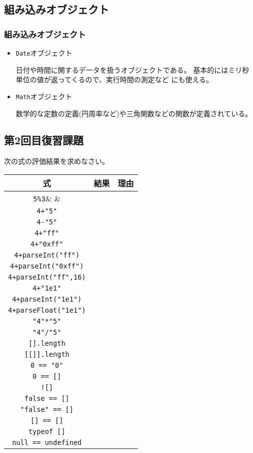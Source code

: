 \subsection{組み込みオブジェクト}
\begin{frame}[containsverbatim]
 \frametitle{組み込みオブジェクト}
\begin{itemize}
 \item \texttt{Date}オブジェクト

日付や時間に関するデータを扱うオブジェクトである。
基本的にはミリ秒単位の値が返ってくるので、実行時間の測定など
にも使える。
 \item {\texttt{Math}オブジェクト}

数学的な定数の定義(円周率など)や三角関数などの関数が定義されている。
\end{itemize}
\end{frame}



\subsection{第2回目復習課題}
\newcommand{\Rule}{\rule[-2ex]{0em}{5ex}}
次の式の評価結果を求めなさい。
\begin{center}
 \begin{tabular}{|>{\Rule}c|p{}|p{}|}\hline
  式&\multicolumn{1}{c|}{結果} &\multicolumn{1}{c|}{理由} \\\hline
  \Verb+5%
  \Verb-4+"5"-& & \\ \hline
  \Verb+4-"5"+& & \\ \hline
  \Verb-4+"ff"-& & \\ \hline
  \Verb-4+"0xff"-& & \\ \hline
  \Verb-4+parseInt("ff")-& & \\ \hline
  \Verb-4+parseInt("0xff")-& & \\ \hline
  \Verb-4+parseInt("ff",16)-& & \\ \hline
  \Verb-4+"1e1"-& & \\ \hline
  \Verb-4+parseInt("1e1")-& & \\ \hline
  \Verb-4+parseFloat("1e1")-& & \\ \hline
  \Verb+"4"*"5"+& & \\ \hline
  \Verb+"4"/"5"+& & \\ \hline
  \Verb+[].length+& & \\ \hline
  \Verb+[[]].length+& & \\ \hline
  \Verb+0 == "0"+& & \\ \hline
  \Verb+0 == []+& & \\ \hline
  \Verb+![]+& & \\ \hline
  \Verb+false == []+& & \\ \hline
  \Verb+"false" == []+& & \\ \hline
  \Verb+[] == []+& & \\ \hline
  \Verb+typeof []+& & \\ \hline
  \Verb+null == undefined+& & \\ \hline
 \end{tabular}
\end{center}
